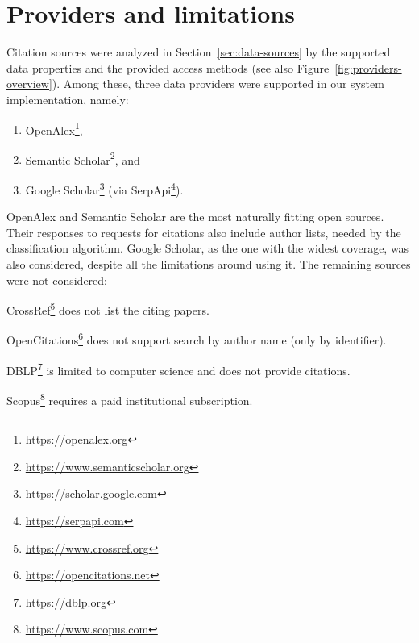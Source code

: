 
\section{Providers and limitations} \label{sec:providers}

Citation sources were analyzed in Section~\ref{sec:data-sources} by the supported data properties and the provided access methods (see also Figure~\ref{fig:providers-overview}). Among these, three data providers were supported in our system implementation, namely: 
\begin{enumerate}
\item
\textsf{OpenAlex}\footnote{\url{https://openalex.org}}, 
\item
\textsf{Semantic Scholar}\footnote{\url{https://www.semanticscholar.org}}, and
\item
\textsf{Google Scholar}\footnote{\url{https://scholar.google.com}} (via \textsf{SerpApi}\footnote{\url{https://serpapi.com}}).
\end{enumerate}
\textsf{OpenAlex} and \textsf{Semantic Scholar} are the most naturally fitting open sources.
Their responses to requests for citations also include author lists, needed by the classification algorithm.
\textsf{Google Scholar}, as the one with the widest coverage, was also considered, despite all the limitations around using it.
The remaining sources were not considered:

\begin{description}
    \item \textsf{CrossRef}\footnote{\url{https://www.crossref.org}} does not list the citing papers.
    \item \textsf{OpenCitations}\footnote{\url{https://opencitations.net}} does not support search by author name (only by identifier).
    \item \textsf{DBLP}\footnote{\url{https://dblp.org}} is limited to computer science and does not provide citations.
    \item \textsf{Scopus}\footnote{\url{https://www.scopus.com}} requires a paid institutional subscription.
\end{description}



